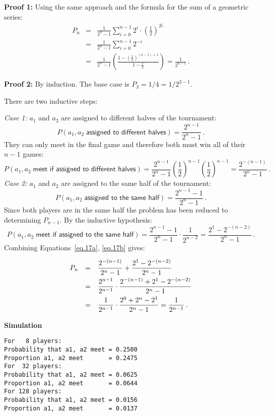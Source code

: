 \textbf{Proof 1:} Using the same approach and the formula for the sum of a geometric series:
\begin{eqnarray*}
P_n&=&\frac{1}{2^n-1}\sum_{i=0}^{n-1}2^i\cdot \left(\frac{1}{2}\right)^{2i}\\
&=&\frac{1}{2^n-1}\sum_{i=0}^{n-1}2^{-i}\\
&=&\frac{1}{2^n-1}
  \left(
    \frac{1-\left(\frac{1}{2}\right)^{(n-1)+1}}
         {1-\frac{1}{2}}
  \right)=\frac{1}{2^{n-1}}\,.
\end{eqnarray*}

\textbf{Proof 2:} By induction. The base case is $P_3=1/4=1/2^{3-1}$.

There are two inductive steps:

\textit{Case 1:} $a_1$ and $a_2$ are assigned to different halves of the tournament:
\[
P(a_1,a_2\;\textsf{assigned to different halves})=\frac{2^{n-1}}{2^n-1}\,.
\]
They can only meet in the final game and therefore both must win all of their $n-1$ games:
\begin{equation}\label{eq.17a}
P(a_1,a_2\;\textsf{meet if assigned to different halves})=\frac{2^{n-1}}{2^n-1} \left(\frac{1}{2}\right)^{n-1} \left(\frac{1}{2}\right)^{n-1}=\frac{2^{-(n-1)}}{2^n-1}\,.
\end{equation}
\textit{Case 2:} $a_1$ and $a_2$ are assigned to the same half of the tournament:
\[
P(a_1,a_2\;\textsf{assigned to the same half})=\frac{2^{n-1}-1}{2^n-1}\,.
\]
Since both players are in the same half the problem has been reduced to determining $P_{n-1}$. By the inductive hypothesis:
\begin{equation}\label{eq.17b}
P(a_1,a_2\;\textsf{meet if assigned to the same half})=\frac{2^{n-1}-1}{2^n-1}\cdot \frac{1}{2^{n-2}}=\frac{2^{1}-2^{-(n-2)}}{2^n-1}\,.
\end{equation}
Combining Equations~\ref{eq.17a}, \ref{eq.17b} gives:
\[
\renewcommand*{\arraystretch}{2.2}
\begin{array}{rcl}
P_n&=&\disfrac{2^{-(n-1)}}{2^n-1}+\disfrac{2^{1}-2^{-(n-2)}}{2^n-1}\\
&=&\disfrac{2^{n-1}}
        {2^{n-1}}\cdot 
   \disfrac{2^{-(n-1)}+2^{1}-2^{-(n-2)}}
        {2^n-1}\\
&=&\disfrac{1}
        {2^{n-1}}\cdot 
   \disfrac{2^0+2^n-2^1}
        {2^n-1}=\disfrac{1}{2^{n-1}}\,.
\end{array}
\]

\textbf{Simulation}
\begin{verbatim}
For   8 players:
Probability that a1, a2 meet = 0.2500
Proportion a1, a2 meet       = 0.2475
For  32 players:
Probability that a1, a2 meet = 0.0625
Proportion a1, a2 meet       = 0.0644
For 128 players:
Probability that a1, a2 meet = 0.0156
Proportion a1, a2 meet       = 0.0137
\end{verbatim}

